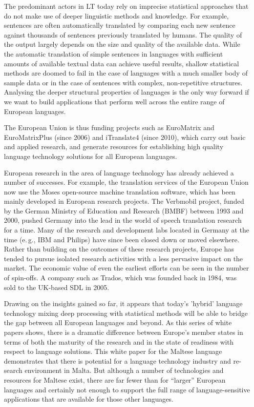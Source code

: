 \documentclass[]{../../metanetpaper}
\begin{document}
\begin{multicols}{2}
The predominant actors in LT today rely on imprecise statistical approaches that do not make use of deeper linguistic methods and knowledge. For example, sentences are often automatically translated by comparing each new sentence against thousands of sentences previously translated by humans. The quality of the output largely depends on the size and quality of the available  data. While the automatic translation of simple sentences in languages with sufficient amounts of available textual data can achieve useful results, shallow statistical methods are doomed to fail in the case of languages with a much smaller body of sample data or in the case of sentences with complex, non-repetitive structures. Analysing the deeper structural properties of languages is the only way forward if we want to build applications that perform well across the entire range of European languages.


The European Union is thus funding projects such as EuroMatrix and EuroMatrixPlus (since 2006) and iTranslate4 (since 2010), which carry out basic and applied research, and generate resources for establishing high quality language technology solutions for all European languages. 

European research in the area of language technology has already achieved a number of successes. For example, the translation services of the European Union now use the Moses open-source machine translation software, which has been mainly developed in European research projects. The Verbmobil project, funded by the German Ministry of Education and Research (BMBF) between 1993 and 2000, pushed Germany into the lead in the world of speech translation research for a time. Many of the research and development labs located in Germany at the time (e.\,g., IBM and Philips) have since been closed down or moved elsewhere. Rather than building on the outcomes of these research projects, Europe has tended to pursue isolated research activities with a less pervasive impact on the market. The economic value of even the earliest efforts can be seen in the number of spin-offs. A company such as Trados, which was founded back in 1984, was sold to the UK-based SDL in 2005.


Drawing on the insights gained so far, it appears that today’s 'hybrid' language technology mixing deep processing with statistical methods will be able to bridge the gap between all European languages and beyond. As this series of white papers shows, there is a dramatic difference between Europe’s member states in terms of both the maturity of the research and in the state of readiness with respect to language solutions. This white paper for the Maltese language demonstrates that there is potential for a language technology industry and re-search environment in Malta. But although a number of technologies and resources for Maltese exist, there are far fewer than for “larger” European languages and certainly not enough to support the full range of language-sensitive applications that are available for those other languages.


\end{multicols}
\end{document}
